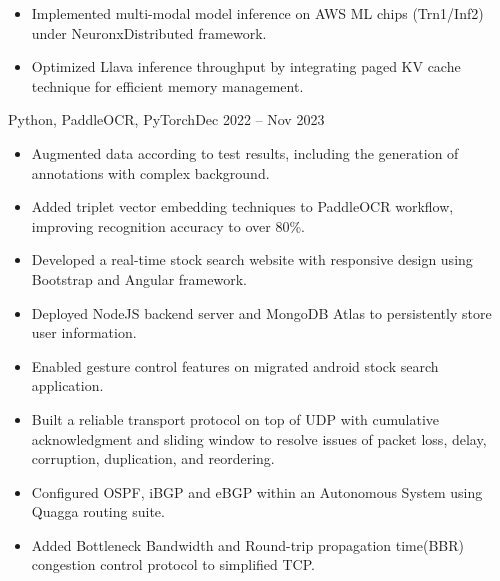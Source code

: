 \documentclass[10pt,a4paper]{altacv}
\begin{document}
\begin{itemize}
	\item Implemented multi-modal model inference on AWS  ML chips (Trn1/Inf2) under NeuronxDistributed framework.
	\item Optimized Llava inference throughput by integrating paged KV cache technique for efficient memory management.
\end{itemize}

 {Python, PaddleOCR, PyTorch}{Dec 2022 -- Nov 2023}
\begin{itemize}
	\item Augmented data according to test results, including the generation of annotations with complex background.
	\item Added triplet vector embedding techniques to PaddleOCR workflow, improving recognition accuracy to over 80\%.
\end{itemize}



\begin{itemize}
	\item Developed a real-time stock search website with responsive design using Bootstrap and Angular framework. \href{http://stock-env.eba-etbgm9hj.us-west-1.elasticbeanstalk.com/search/home}{\faExternalLink}
	\item Deployed NodeJS backend server and MongoDB Atlas to persistently store user information.
	\item Enabled gesture control features on migrated android stock search application.
\end{itemize}

\begin{itemize}
	\item Built a reliable transport protocol on top of UDP with cumulative acknowledgment and sliding window to resolve issues of packet loss, delay, corruption, duplication, and reordering.
	\item Configured OSPF, iBGP and eBGP within an Autonomous System using Quagga routing suite.
	\item Added Bottleneck Bandwidth and Round-trip propagation time(BBR) congestion control protocol to simplified TCP.
\end{itemize}
\end{document}
